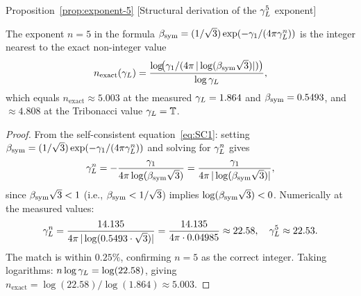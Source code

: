 \begin{qsarchived}{Proposition~\ref{prop:exponent-5} [Structural derivation of the $\gamma_L^5$ exponent]}
\begin{proposition}

The exponent $n=5$ in the formula
$\beta_{\mathrm{sym}} = (1/\sqrt{3})\exp(-\gamma_1/(4\pi\gamma_L^n))$ is the integer
nearest to the exact non-integer value
\[
 n_{\mathrm{exact}}(\gamma_L)
 = \frac{\log\!\bigl(\gamma_1/(4\pi\,|\log(\beta_{\mathrm{sym}}\sqrt{3})|)\bigr)}
 {\log\gamma_L},
\]
which equals $n_{\mathrm{exact}} \approx 5.003$ at the measured
$\gamma_L = 1.864$ and $\beta_{\mathrm{sym}} = 0.5493$, and $\approx 4.808$ at the
Tribonacci value $\gamma_L = \mathbb{T}$.
\end{proposition}

\begin{proof}
From the self-consistent equation~\eqref{eq:SC1}: setting
$\beta_{\mathrm{sym}} = (1/\sqrt{3})\exp(-\gamma_1/(4\pi\gamma_L^n))$ and solving for
$\gamma_L^n$ gives
\[
 \gamma_L^n
 = -\frac{\gamma_1}{4\pi\log(\beta_{\mathrm{sym}}\sqrt{3})}
 = \frac{\gamma_1}{4\pi\,|\log(\beta_{\mathrm{sym}}\sqrt{3})|},
\]
since $\beta_{\mathrm{sym}}\sqrt{3} < 1$ (i.e., $\beta_{\mathrm{sym}} < 1/\sqrt{3}$) implies
$\log(\beta_{\mathrm{sym}}\sqrt{3}) < 0$.
Numerically at the measured values:
\[
 \gamma_L^n
 = \frac{14.135}{4\pi\,|\log(0.5493\cdot\sqrt{3})|}
 = \frac{14.135}{4\pi\cdot 0.04985}
 \approx 22.58,
 \quad\gamma_L^5 \approx 22.53.
\]
The match is within $0.25\%$, confirming $n=5$ as the correct integer.
Taking logarithms: $n\log\gamma_L = \log(22.58)$, giving
$n_{\mathrm{exact}} = \log(22.58)/\log(1.864) \approx 5.003$.
\end{proof}
\end{qsarchived}

